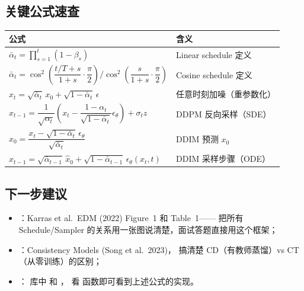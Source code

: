 \subsection{关键公式速查}

\begin{summarybox}
\renewcommand{\arraystretch}{1.7}
\begin{tabular}{p{7cm}p{6.5cm}}
\hline
\textbf{公式} & \textbf{含义} \\
\hline
$\bar\alpha_t = \prod_{s=1}^{t}(1-\beta_s)$
  & Linear schedule 定义 \\[4pt]
$\bar\alpha_t = \cos^2\!\!\left(\dfrac{t/T+s}{1+s}\cdot\dfrac{\pi}{2}\right)\bigg/\cos^2\!\!\left(\dfrac{s}{1+s}\cdot\dfrac{\pi}{2}\right)$
  & Cosine schedule 定义 \\[8pt]
$x_t = \sqrt{\bar\alpha_t}\,x_0 + \sqrt{1-\bar\alpha_t}\,\epsilon$
  & 任意时刻加噪（重参数化） \\[4pt]
$x_{t-1} = \dfrac{1}{\sqrt{\alpha_t}}\!\left(x_t
  - \dfrac{1-\alpha_t}{\sqrt{1-\bar\alpha_t}}\epsilon_\theta\right) + \sigma_t z$
  & DDPM 反向采样（SDE） \\[8pt]
$\hat{x}_0 = \dfrac{x_t - \sqrt{1-\bar\alpha_t}\,\epsilon_\theta}{\sqrt{\bar\alpha_t}}$
  & DDIM 预测 $x_0$ \\[8pt]
$x_{t-1} = \sqrt{\bar\alpha_{t-1}}\,\hat{x}_0
  + \sqrt{1-\bar\alpha_{t-1}}\,\epsilon_\theta(x_t,t)$
  & DDIM 采样步骤（ODE） \\[4pt]
\hline
\end{tabular}
\end{summarybox}

\subsection{下一步建议}

\begin{itemize}
  \item {}：Karras et al.\ EDM (2022) Figure~1 和 Table~1——
        把所有 Schedule/Sampler 的关系用一张图说清楚，面试答题直接用这个框架；
  \item {}：Consistency Models (Song et al.\ 2023)，
        搞清楚 CD（有教师蒸馏）vs CT（从零训练）的区别；
  \item {}： 库中
         和 ，
        看  函数即可看到上述公式的实现。
\end{itemize}

